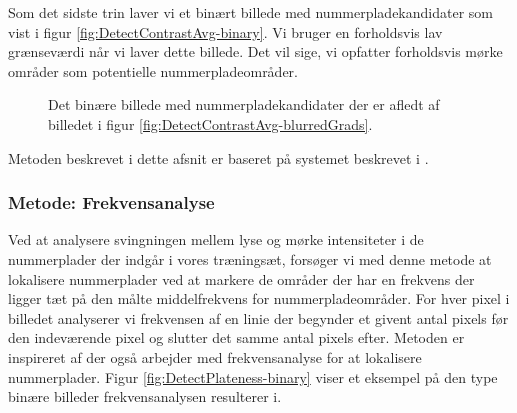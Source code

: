 Som det sidste trin laver vi et binært billede med nummerpladekandidater som vist i figur \vref{fig:DetectContrastAvg-binary}. Vi bruger en forholdsvis lav grænseværdi når vi laver dette billede. Det vil sige, vi opfatter forholdsvis mørke områder som potentielle nummerpladeområder.

\begin{figure}[htp]
  \centering
  \caption{Det binære billede med nummerpladekandidater der er afledt af billedet i figur \vref{fig:DetectContrastAvg-blurredGrads}.}
  \label{fig:DetectContrastAvg-binary}
\end{figure}

Metoden beskrevet i dette afsnit er baseret på systemet beskrevet i \cite{shapiro}.

\subsubsection{Metode: Frekvensanalyse}
\label{sec:DetectPlateness}
Ved at analysere svingningen mellem lyse og mørke intensiteter i de nummerplader der indgår i vores træningsæt, forsøger vi med denne metode at lokalisere nummerplader ved at markere de områder der har en frekvens der ligger tæt på den målte middelfrekvens for nummerpladeområder.  For hver pixel i billedet analyserer vi frekvensen af en linie der begynder et givent antal pixels før den indeværende pixel og slutter det samme antal pixels efter. Metoden er inspireret af \cite{kwas} der også arbejder med frekvensanalyse for at lokalisere nummerplader. Figur \vref{fig:DetectPlateness-binary} viser et eksempel på den type binære billeder frekvensanalysen resulterer i.

